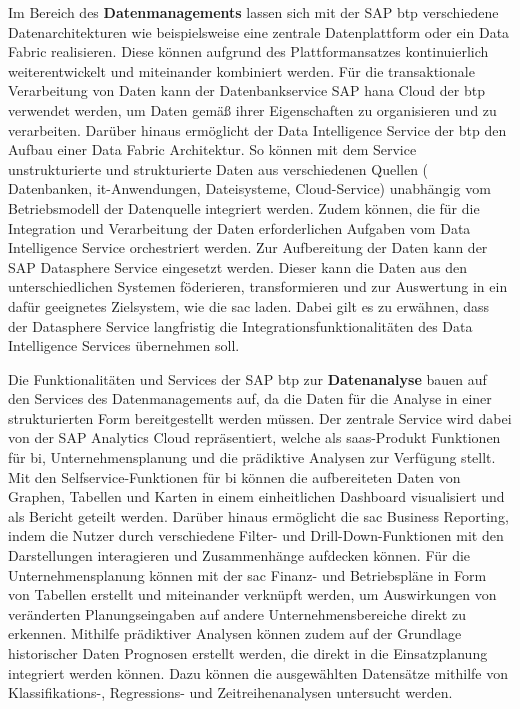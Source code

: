Im Bereich des \textbf{Datenmanagements} lassen sich mit der SAP \ac{btp} verschiedene Datenarchitekturen wie beispielsweise eine zentrale Datenplattform oder ein Data Fabric realisieren. Diese können aufgrund des Plattformansatzes kontinuierlich weiterentwickelt und miteinander kombiniert werden. Für die transaktionale Verarbeitung von Daten kann der Datenbankservice SAP \ac{hana} Cloud der \ac{btp} verwendet werden, um Daten gemäß ihrer Eigenschaften zu organisieren und zu verarbeiten. Darüber hinaus ermöglicht der Data Intelligence Service der \ac{btp} den Aufbau einer Data Fabric Architektur. \autocite[Vgl.][S. 64-66]{SEUBERT} So können mit dem Service unstrukturierte und strukturierte Daten aus verschiedenen Quellen ( Datenbanken, \ac{it}-Anwendungen, Dateisysteme, Cloud-Service) unabhängig vom Betriebsmodell der Datenquelle integriert werden. Zudem können, die für die Integration und Verarbeitung der Daten erforderlichen Aufgaben vom Data Intelligence Service orchestriert werden. \autocite[Vgl.][]{DATAINTELLIGENCE} Zur Aufbereitung der Daten kann der SAP Datasphere Service eingesetzt werden. Dieser kann die Daten aus den unterschiedlichen Systemen föderieren, transformieren und zur Auswertung in ein dafür geeignetes Zielsystem, wie die \ac{sac} laden. \autocite[Vgl.][S. 3]{FSDDATASPHERE}  Dabei gilt es zu erwähnen, dass der Datasphere Service langfristig die Integrationsfunktionalitäten des Data Intelligence Services übernehmen soll. \autocite[Vgl.][]{QUIRK2023}

Die Funktionalitäten und Services der SAP \ac{btp} zur \textbf{Datenanalyse} bauen auf den Services des Datenmanagements auf, da die Daten für die Analyse in einer strukturierten Form bereitgestellt werden müssen. Der zentrale Service wird dabei von der SAP Analytics Cloud repräsentiert, welche als \ac{saas}-Produkt Funktionen für \ac{bi}, Unternehmensplanung und die prädiktive Analysen zur Verfügung stellt. Mit den Selfservice-Funktionen für \ac{bi} können die aufbereiteten Daten von Graphen, Tabellen und Karten in einem einheitlichen Dashboard visualisiert und als Bericht geteilt werden. Darüber hinaus ermöglicht die \ac{sac} Business Reporting, indem die Nutzer durch verschiedene Filter- und Drill-Down-Funktionen mit den Darstellungen interagieren und Zusammenhänge aufdecken können. Für die Unternehmensplanung können mit der \ac{sac} Finanz- und Betriebspläne in Form von Tabellen erstellt und miteinander verknüpft werden, um Auswirkungen von veränderten Planungseingaben auf andere Unternehmensbereiche direkt zu erkennen. Mithilfe prädiktiver Analysen können zudem auf der Grundlage historischer Daten Prognosen erstellt werden, die direkt in die Einsatzplanung integriert werden können. \autocite[Vgl.][S. 64-67]{SEUBERT} Dazu können die ausgewählten Datensätze mithilfe von Klassifikations-, Regressions- und Zeitreihenanalysen untersucht werden. \autocite[Vgl.][]{FSDSAC2023}

